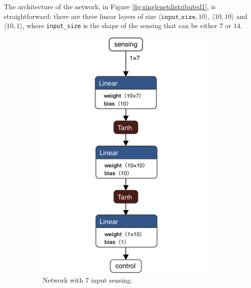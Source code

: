 The architecture of the network, in Figure \ref{fig:singlenetdistributed1}, is 
straightforward: there are three linear layers of size $\langle\mathtt{input\_size}, 
10\rangle$,  $\langle 10, 10\rangle$ and $\langle 10, 1\rangle$, where 
\texttt{input\_size} is the shape of the sensing that can be either $7$ or $14$.
\begin{figure}[htb]
	\centering
	\begin{subfigure}[h]{0.495\textwidth}
		\centering
		\includegraphics[width=.8\textwidth]{contents/images/task1distributed@4x}%
		\caption{Network with $7$ input sensing.}
		\label{fig:singlenet-d7distributed1}
	\end{subfigure}
	\hfill
	\begin{subfigure}[h]{0.495\textwidth}
		\centering

\end{subfigure}
\end{figure}
